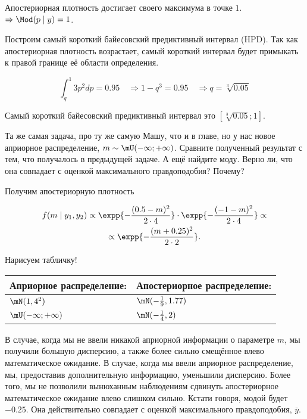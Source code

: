 \begin{problem}
\begin{sol}
Апостериорная плотность достигает своего максимума в точке $1$. $\Rightarrow \Mod(p \mid y) = 1$.
			
			
Построим самый короткий байесовский предиктивный интервал (HPD). Так как апостериорная плотность возрастает, самый короткий интервал будет примыкать к правой границе её области определения.
			
\[ \int_q^1 3p^2 dp = 0.95 \quad \Rightarrow 1 - q^3 = 0.95 \quad \Rightarrow q = \sqrt[3]{0.05} \]

Самый короткий байесовский предиктивный интервал это $[\sqrt[3]{0.05};1]$.

\end{sol}
\end{problem}


\begin{problem}\label{upr_norm}
	Та же самая задача, про ту же самую Машу, что и в главе, но у нас новое априорное распределение, $m \sim \mU(-\infty; +\infty)$. Сравните полученный результат с тем, что получалось в предыдущей задаче. А ещё найдите моду. Верно ли, что она совпадает с оценкой максимального правдоподобия? Почему? 
	\begin{sol}
		
		Получим апостериорную плотность
		
		\begin{multline*}
		 f(m \mid y_1, y_2) \propto \expp{-\frac{(0.5 - m)^2}{2 \cdot 4}} \cdot \expp{-\frac{(-1 - m)^2}{2 \cdot 4}} \propto \\ \propto \expp{-\frac{(m+0.25)^2}{2 \cdot 2}}.
		 \end{multline*}
		
		Нарисуем табличку! 
		
		\begin{table}[H]
		\begin{tabularx}{\textwidth}{XX}
			\toprule
			Априорное распределение: & Апостериорное распределение: \\
			\midrule
			$\mN(1,4^2)$             &  $\mN(-\frac{1}{9},1.77)$ \\
			$\mU(-\infty;+\infty)$   &  $\mN(-\frac{1}{4},2)$ \\
			\bottomrule
		\end{tabularx}
		\end{table}
		
		В случае, когда мы не ввели никакой априорной информации о параметре $m$, мы получили большую дисперсию, а также более сильно смещённое влево математическое ожидание. В случае, когда мы ввели априорное распределение, мы, предоставив дополнительную информацию, уменьшили дисперсию. Более того, мы не позволили вынюханным наблюдениям сдвинуть апостериорное математическое ожидание влево слишком сильно. Кстати говоря, модой будет $-0.25$.  Она действительно совпадает с  оценкой максимального правдоподобия, $\bar y$.
	\end{sol}
\end{problem}



